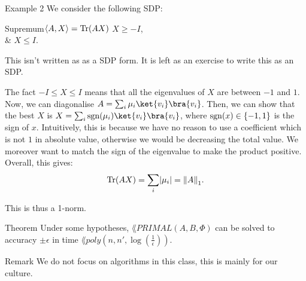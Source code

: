 \documentclass[a4paper]{article}
\begin{document}
\begin{parag}{Example 2}
    We consider the following SDP:
    \begin{semidefiniteprogram}{Supremum}{$\left\langle A, X \right\rangle = \Tr\left(AX\right)$}
        $X \geq -I$,\\
        & $X \leq I$.
    \end{semidefiniteprogram}

    This isn't written as as a SDP form. It is left as an exercise to write this as an SDP.

    The fact $-I \leq X \leq I$ means that all the eigenvalues of $X$ are between $-1$ and $1$. Now, we can diagonalise $A = \sum_{i} \mu_i \ket{v_i} \bra{v_i}$. Then, we can show that the best $X$ is $X = \sum_{i} \sgn\left(\mu_i\right) \ket{v_i}\bra{v_i}$, where $\sgn\left(x\right) \in \left\{-1, 1\right\}$ is the sign of $x$. Intuitively, this is because we have no reason to use a coefficient which is not $1$ in absolute value, otherwise we would be decreasing the total value. We moreover want to match the sign of the eigenvalue to make the product positive. Overall, this gives:
    \[\Tr\left(AX\right) = \sum_{i} \left|\mu_i\right| = \left\|A\right\|_1.\]

    This is thus a 1-norm.
\end{parag}

\begin{parag}{Theorem}
    Under some hypotheses, $\lang{PRIMAL}\left(A, B, \Phi\right)$ can be solved to accuracy $\pm \epsilon$ in time $\lang{poly}\left(n, n', \log\left(\frac{1}{\epsilon}\right)\right)$.

    \begin{subparag}{Remark}
        We do not focus on algorithms in this class, this is mainly for our culture.
    \end{subparag}
\end{parag}
\end{document}
